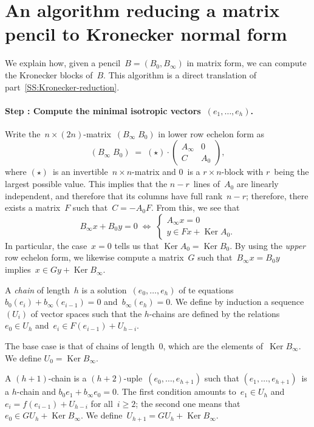 \documentclass{article}%
\newif\ifapx \apxtrue %
\def\mat#1{\begin{pmatrix}#1\end{pmatrix}}
\DeclareMathOperator\Ker{Ker}
\begin{document}


\ifapx \appendix
\section{An algorithm reducing a matrix pencil to Kronecker normal form}%
\label{A:algo}

We explain how, given a pencil~$B = (B_{0}, B_{∞})$ in matrix form, we
can compute the Kronecker blocks of~$B$. This algorithm is a direct
translation of part~\ref{SS:Kronecker-reduction}.
\def\step#1{\paragraph{Step : #1.}}

\step{Compute the minimal isotropic vectors~$(e_1,…,e_h)$}%

Write the~$n × (2n)$-matrix~$(B_{∞} \; B_0)$ in lower row echelon form as
\begin{equation}
(B_{∞} \; B_0) \;=\; (⋆) · \mat{A_{∞} & 0\\ C & A_0},
\end{equation}
where $(⋆)$~is an invertible~$n × n$-matrix and
$0$~is a $r × n$-block with $r$~being the largest possible value.
This implies that the $n-r$~lines of~$A_0$ are linearly independent, and
therefore that its columns have full rank~$n-r$; therefore, there exists
a matrix~$F$ such that~$C = -A_0 F$. From this, we see that
\begin{equation}
B_{∞} x + B_0 y = 0 \;⇔ \; \begin{cases} A_{∞} x = 0\\ y ∈ Fx + \Ker A_0.
\end{cases}
\end{equation}
In particular, the case~$x = 0$ tells us that $\Ker A_0 = \Ker B_0$. By
using the \emph{upper} row echelon form, we likewise compute a matrix~$G$
such that~$B_{∞} x = B_0 y$ implies~$x ∈ G y + \Ker B_{∞}$.

A \emph{chain} of length~$h$ is a solution~$(e_0,…,e_h)$ of te
equations~$b_0(e_i) + b_{∞}(e_{i-1}) = 0$ and~$b_{∞}(e_h) = 0$.
We define by induction a sequence~$(U_i)$ of vector spaces such that the
$h$-chains are defined by the relations~$e_0 ∈ U_h$ and~$e_i ∈ F(e_{i-1})
+ U_{h-i}$.

The base case is that of chains of length~$0$, which are the
elements of~$\Ker B_{∞}$. We define $U_0 = \Ker B_{∞}$.

A $(h+1)$-chain is a $(h+2)$-uple~$(e_0,…,e_{h+1})$ such that
$(e_1,…,e_{h+1})$~is a $h$-chain and $b_{0} e_1 + b_{∞} e_0 = 0$.
The first condition amounts to~$e_1 ∈ U_h$ and~$e_i = f(e_{i-1}) +
U_{h-i}$ for all~$i ≥ 2$; the second one means that $e_0 ∈ G U_{h} + \Ker
B_{∞}$. We define~$U_{h+1} = G U_h + \Ker B_{∞}$.
\end{document}
